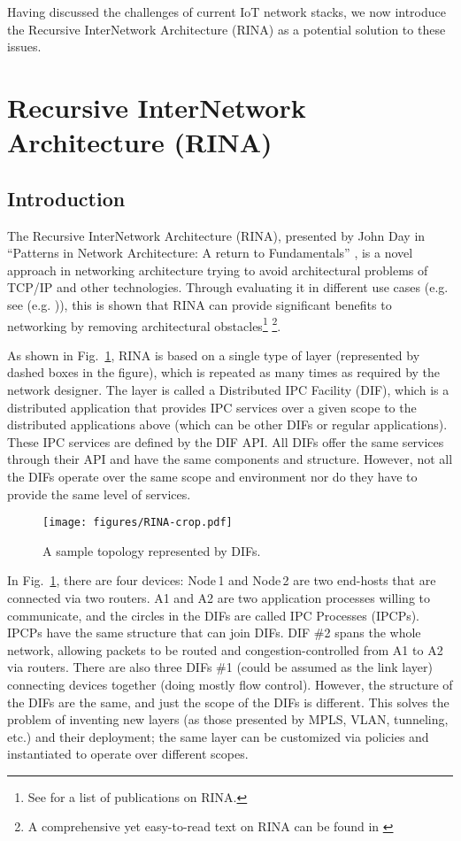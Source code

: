 \documentclass{ieeeaccess}
\begin{document}
Having discussed the challenges of current IoT network stacks, we now introduce the Recursive InterNetwork Architecture (RINA) as a potential solution to these issues.


\section{Recursive InterNetwork Architecture (RINA)}
\label{sec:rina}
\subsection{Introduction}

The Recursive InterNetwork Architecture (RINA), presented by John Day in ``Patterns in Network Architecture: A return to Fundamentals'' \cite{Day:2008:PNA}, is a novel approach in networking architecture trying to avoid architectural problems of TCP/IP and other technologies. Through evaluating it in different use cases (e.g. see (e.g. \cite{peymanICC16,boddapati2012assessing,day2008networking,7510780,leon2016benefits,small2012})), this is shown that RINA can provide significant benefits to networking by removing architectural obstacles\footnote{See \cite{pouzinsociety} for a list of publications on RINA.} \footnote{A comprehensive yet easy-to-read text on RINA can be found in \cite{NGP2019}}. 


As shown in Fig.~\ref{fig:rina}, RINA is based on a single type of layer (represented by dashed boxes in the figure), which is repeated as many times as required by the network designer. The layer is called a Distributed IPC Facility (DIF), which is a distributed application that provides IPC services over a given scope to the distributed applications above (which can be other DIFs or regular applications). These IPC services are defined by the DIF API. All DIFs offer the  same services through their API and have the same components and structure. However, not all the DIFs operate over the same scope and environment nor do they have to provide the same level of services. 

\begin{figure}[!t]
	\centering
	\texttt{[image: figures/RINA-crop.pdf]}
	\caption{A sample topology represented by DIFs.}
	\label{fig:rina}
\end{figure}

In Fig.~\ref{fig:rina}, there are four devices: Node\,1 and Node\,2 are two end-hosts that are connected via two routers. A1 and A2 are two application processes willing to communicate, and the circles in the DIFs are called IPC Processes (IPCPs). IPCPs have the same structure that can join DIFs. DIF \#2 spans the whole network, allowing packets to be routed and congestion-controlled from A1 to A2 via routers. There are also three DIFs \#1 (could be assumed as the link layer) connecting devices together (doing mostly flow control). However, the structure of the DIFs are the same, and just the scope of the DIFs is different. This solves the problem of inventing new layers (as those presented by MPLS, VLAN, tunneling, etc.) and their deployment; the same layer can be customized via policies and instantiated to operate over different scopes.
\end{document}
